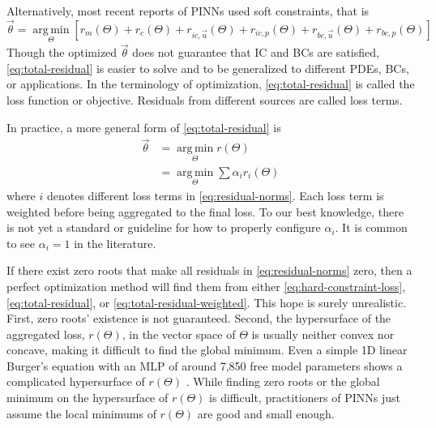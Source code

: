 Alternatively, most recent reports of PINNs used soft constraints, that is
\begin{equation}\label{eq:total-residual}
    \vec{\theta} = \operatorname*{arg\,min}\limits_{\Theta} \left[
        r_m(\Theta) + r_c(\Theta) + r_{ic,\vec{u}}(\Theta) + r_{ic,p}(\Theta) + r_{bc,\vec{u}}(\Theta) + r_{bc,p}(\Theta)
    \right]
\end{equation}
Though the optimized $\vec{\theta}$ does not guarantee that IC and BCs are satisfied, \eqref{eq:total-residual} is easier to solve and to be generalized to different PDEs, BCs, or applications.
In the terminology of optimization, \eqref{eq:total-residual} is called the loss function or objective.
Residuals from different sources are called loss terms.

In practice, a more general form of \eqref{eq:total-residual} is
\begin{equation}\label{eq:total-residual-weighted}
    \begin{aligned}
        \vec{\theta}
        &=
        \operatorname*{arg\,min}\limits_{\Theta} r(\Theta)  \\
        &=
        \operatorname*{arg\,min}\limits_{\Theta} \sum \alpha_i r_i(\Theta)
    \end{aligned}
\end{equation}
where $i$ denotes different loss terms in \eqref{eq:residual-norms}.
Each loss term is weighted before being aggregated to the final loss.
To our best knowledge, there is not yet a standard or guideline for how to properly configure $\alpha_i$.
It is common to see $\alpha_i=1$ in the literature.

If there exist zero roots that make all residuals in \eqref{eq:residual-norms} zero, then a perfect optimization method will find them from either \eqref{eq:hard-constraint-loss}, \eqref{eq:total-residual}, or \eqref{eq:total-residual-weighted}.
This hope is surely unrealistic.
First, zero roots' existence is not guaranteed.
Second, the hypersurface of the aggregated loss, $r(\Theta)$, in the vector space of $\Theta$ is usually neither convex nor concave, making it difficult to find the global minimum.
Even a simple 1D linear Burger's equation with an MLP of around 7,850 free model parameters shows a complicated hypersurface of $r(\Theta)$ \cite{krishnapriyan_characterizing_2021}.
While finding zero roots or the global minimum on the hypersurface of $r(\Theta)$ is difficult, practitioners of PINNs just assume the local minimums of $r(\Theta)$ are good and small enough.

